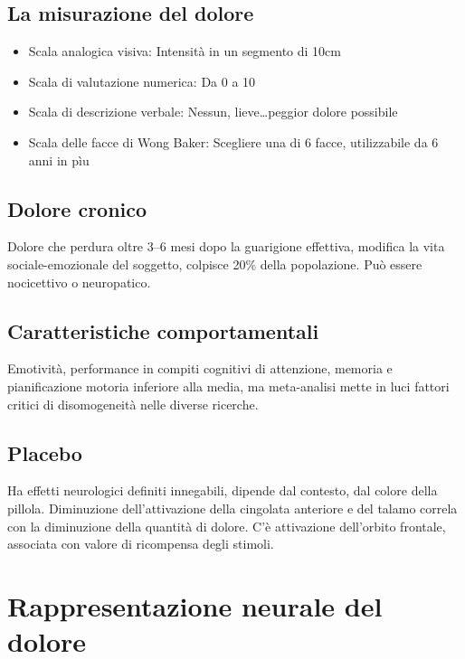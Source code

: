 \documentclass[12pt, a4paper]{article}
\begin{document}
\subsection{La misurazione del dolore}

\begin{itemize}
    \item Scala analogica visiva: Intensità in un segmento di 10cm
    \item Scala di valutazione numerica: Da 0 a 10
    \item Scala di descrizione verbale: Nessun, lieve\ldots peggior dolore possibile
    \item Scala delle facce di Wong Baker: Scegliere una di 6 facce, utilizzabile da 6 anni in pìu
\end{itemize}

\subsection{Dolore cronico}

Dolore che perdura oltre 3--6 mesi dopo la guarigione effettiva, modifica la vita sociale-emozionale del soggetto, colpisce 20\% della popolazione.
Può essere nocicettivo o neuropatico.

\subsection{Caratteristiche comportamentali} 

Emotività, performance in compiti cognitivi di attenzione, memoria e pianificazione motoria inferiore alla media, ma meta-analisi mette in luci fattori critici di disomogeneità nelle diverse ricerche.

\subsection{Placebo} 

Ha effetti neurologici definiti innegabili, dipende dal contesto, dal colore della pillola. Diminuzione dell'attivazione della cingolata anteriore e del talamo correla con la diminuzione della quantità di dolore. C'è attivazione dell'orbito frontale, associata con valore di ricompensa degli stimoli.

\section{Rappresentazione neurale del dolore}
\end{document}
